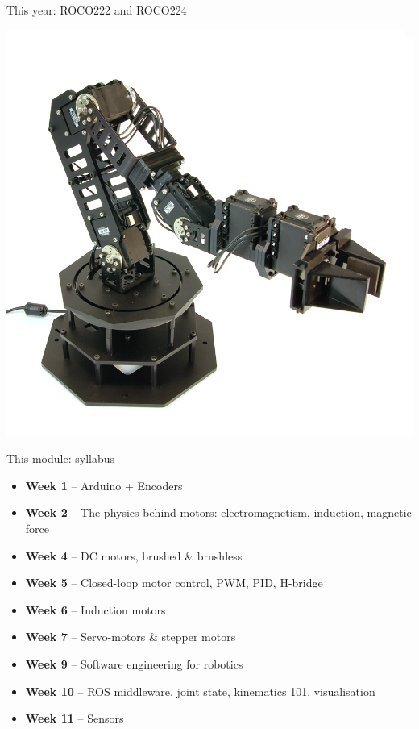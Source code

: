 \documentclass[compress]{beamer}
\begin{document}
\begin{frame}{This year: ROCO222 and ROCO224}
{    \begin{center}
        \includegraphics[width=0.6\paperheight]{servo-arm}
    \end{center}

    }

\end{frame}

\begin{frame}{This module: syllabus}

\begin{itemize}
    \item<+-> \textbf{Week 1} -- Arduino + Encoders
    \item<+-> \textbf{Week 2} -- The physics behind motors: electromagnetism, induction, magnetic
        force
    \item<+-> \textbf{Week 4} -- DC motors, brushed \& brushless
    \item<+-> \textbf{Week 5} -- Closed-loop motor control, PWM, PID, H-bridge
    \item<+-> \textbf{Week 6} -- Induction motors
    \item<+-> \textbf{Week 7} -- Servo-motors \& stepper motors
    \item<+-> \textbf{Week 9} -- Software engineering for robotics
    \item<+-> \textbf{Week 10} -- ROS middleware, joint state, kinematics 101, visualisation
    \item<+-> \textbf{Week 11} -- Sensors
\end{itemize}

\end{frame}
\end{document}
